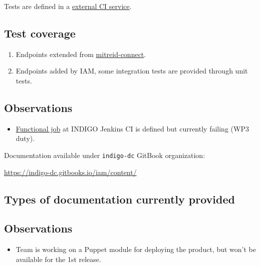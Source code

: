 \documentclass[a4wide,11pt]{article}
\begin{document}

\label{sec:func_int_test}

Tests are defined in a \href{http://radiohead.cnaf.infn.it:9999/view/1_IAM/job/iam-master/lastBuild/testReport/}{external CI service}.

\subsection{Test coverage}
\begin{enumerate}
        \item Endpoints extended from \href{https://github.com/mitreid-connect/OpenID-Connect-Java-Spring-Server}{mitreid-connect}.
        \item Endpoints added by IAM, some integration tests are provided through unit tests.
    \end{enumerate}


\subsection{Observations}
\begin{itemize}
        \item \href{https://jenkins.indigo-datacloud.eu:8080/job/iam-functional}{Functional job} at INDIGO Jenkins CI is defined but currently failing (WP3 duty).
    \end{itemize}



\label{sec:gitbook}
Documentation available under \texttt{indigo-dc} GitBook organization: \vspace{0.1em} \begin{center}\url{https://indigo-dc.gitbooks.io/iam/content/}\end{center} 
\subsection{Types of documentation currently provided}
\begin{center}
\end{center}



\label{sec:configuration}



\subsection{Observations}
\begin{itemize}
        \item Team is working on a Puppet module for deploying the product, but won't be available for the 1st release.
    \end{itemize}


\newpage

\end{document}
